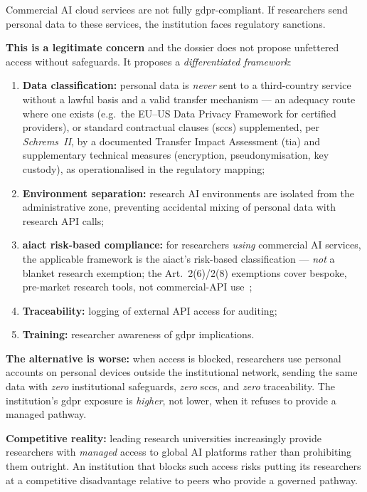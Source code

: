 \bigskip

\begin{questionbox}
Commercial AI cloud services are not fully \gls{gdpr}-compliant. If researchers send personal data to these services, the institution faces regulatory sanctions.
\end{questionbox}

\begin{answerbox}[Answer to Q4.2]
\textbf{This is a legitimate concern} and the dossier does not propose unfettered access without safeguards. It proposes a \emph{differentiated framework}:

\begin{enumerate}[nosep]
    \item \textbf{Data classification:} personal data is \emph{never} sent to a third-country service without a lawful basis and a valid transfer mechanism --- an adequacy route where one exists (e.g.\ the EU--US Data Privacy Framework for certified providers), or standard contractual clauses (\gls{scc}s) supplemented, per \emph{Schrems~II}, by a documented Transfer Impact Assessment (\gls{tia}) and supplementary technical measures (encryption, pseudonymisation, key custody), as operationalised in the regulatory mapping;
    \item \textbf{Environment separation:} research AI environments are isolated from the administrative zone, preventing accidental mixing of personal data with research API calls;
    \item \textbf{\gls{aiact} risk-based compliance:} for researchers \emph{using} commercial AI services, the applicable framework is the \gls{aiact}'s risk-based classification --- \emph{not} a blanket research exemption; the Art.~2(6)/2(8) exemptions cover bespoke, pre-market research tools, not commercial-API use~\cite{eu-ai-act};
    \item \textbf{Traceability:} logging of external API access for auditing;
    \item \textbf{Training:} researcher awareness of \gls{gdpr} implications.
\end{enumerate}

\noindent\textbf{The alternative is worse:} when access is blocked, researchers use personal accounts on personal devices outside the institutional network, sending the same data with \emph{zero} institutional safeguards, \emph{zero} \gls{scc}s, and \emph{zero} traceability. The institution's \gls{gdpr} exposure is \emph{higher}, not lower, when it refuses to provide a managed pathway.

\medskip\noindent\textbf{Competitive reality:} leading research universities increasingly provide researchers with \emph{managed} access to global AI platforms rather than prohibiting them outright. An institution that blocks such access risks putting its researchers at a competitive disadvantage relative to peers who provide a governed pathway.
\end{answerbox}

